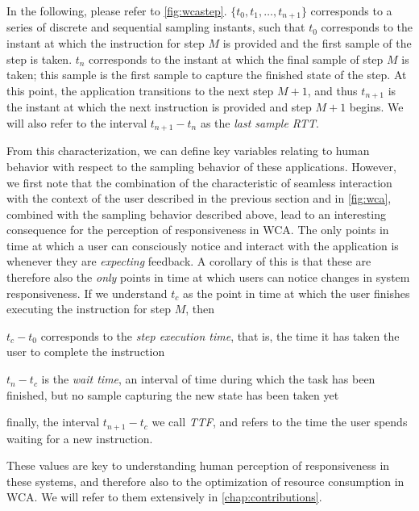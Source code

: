 In the following, please refer to \cref{fig:wcastep}.
\ensuremath{\{ t_0, t_1, \ldots, t_{n + 1} \}} corresponds to a series of discrete and sequential sampling instants, such that \ensuremath{t_0} corresponds to the instant at which the instruction for step \ensuremath{M} is provided and the first sample of the step is taken.
\ensuremath{t_n} corresponds to the instant at which the final sample of step \ensuremath{M} is taken;
this sample is the first sample to capture the finished state of the step.
At this point, the application transitions to the next step \ensuremath{M + 1}, and thus \ensuremath{t_{n + 1}} is the instant at which the next instruction is provided and step \ensuremath{M + 1} begins.
We will also refer to the interval \ensuremath{t_{n + 1} - t_n} as the \emph{last sample \gls{RTT}}.

%
From this characterization, we can define key variables relating to human behavior with respect to the sampling behavior of these applications.
However, we first note that the combination of the characteristic of seamless interaction with the context of the user described in the previous section and in \cref{fig:wca}, combined with the sampling behavior described above, lead to an interesting consequence for the perception of responsiveness in \gls{WCA}.
The only points in time at which a user can consciously notice and interact with the application is whenever they are \emph{expecting} feedback.
A corollary of this is that these are therefore also the \emph{only} points in time at which users can notice changes in system responsiveness.
If we understand \ensuremath{t_c} as the point in time at which the user finishes executing the instruction for step \ensuremath{M}, then
\begin{inlineenum}
    \item \ensuremath{t_c - t_0} corresponds to the \emph{step execution time}, that is, the time it has taken the user to complete the instruction
    \item \ensuremath{t_n - t_c} is the \emph{wait time}, an interval of time during which the task has been finished, but no sample capturing the new state has been taken yet
    \item finally, the interval \ensuremath{t_{n + 1} - t_c} we call \emph{\gls{TTF}}, and refers to the time the user spends waiting for a new instruction.
\end{inlineenum}
These values are key to understanding human perception of responsiveness in these systems, and therefore also to the optimization of resource consumption in \gls{WCA}.
We will refer to them extensively in \cref{chap:contributions}.

